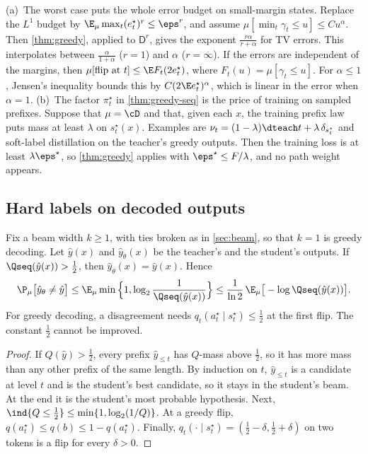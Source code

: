 \begin{remark}\label{rem:decoding-training}
(a)~The worst case puts the whole error budget on small-margin states. Replace the $L^1$ budget by
$\E_\mu\max_t(e^\star_t)^r\le\eps^r$, and assume $\mu[\min_t\gamma_t\le u]\le Cu^\alpha$. Then \cref{thm:greedy}, applied to
$\mathsf D^r$, gives the exponent $\frac{r\alpha}{r+\alpha}$ for TV errors. This interpolates between $\frac\alpha{1+\alpha}$ ($r=1$)
and $\alpha$ ($r=\infty$). If the errors are independent of the margins, then
$\mu[\text{flip at }t]\le\E F_t(2e^\star_t)$, where $F_t(u)=\mu[\gamma_t\le u]$. For $\alpha\le1$, Jensen's inequality bounds
this by $C(2\E e^\star_t)^\alpha$, which is linear in the error when $\alpha=1$.
(b)~The factor $\pi^\star_t$ in \cref{thm:greedy-seq} is the price of training on sampled prefixes. Suppose that
$\mu=\cD$ and that, given each $x$, the training prefix law puts mass at least $\lambda$ on $s^\star_t(x)$. Examples
are $\nu_t=(1-\lambda)\dteach t+\lambda\,\delta_{s^\star_t}$ and soft-label distillation on the teacher's greedy outputs.
Then the training loss is at least $\lambda\eps^\star$, so \cref{thm:greedy} applies with $\eps^\star\le F/\lambda$, and no
path weight appears.
\end{remark}

\subsection{Hard labels on decoded outputs}

\begin{proposition}\label{prop:hard}
\Pv\Ck Fix a beam width $k\ge1$, with ties broken as in \cref{sec:beam}, so that $k=1$ is greedy decoding. Let
$\hat y(x)$ and $\hat y_\theta(x)$ be the teacher's and the student's outputs. If $\Qseq(\hat y(x))>\frac12$, then $\hat y_\theta(x)=\hat y(x)$. Hence
\[
\P_\mu\big[\hat y_\theta\ne\hat y\big]\le\E_\mu\min\Big\{1,\log_2\frac1{\Qseq(\hat y(x))}\Big\}\le\frac1{\ln2}\,\E_\mu\big[-\log\Qseq(\hat y(x))\big].
\]
For greedy decoding, a disagreement needs $q_t(a^\star_t\mid s^\star_t)\le\frac12$ at the first flip. The constant $\frac12$
cannot be improved.
\end{proposition}
\begin{proof}
If $Q(\hat y)>\frac12$, every prefix $\hat y_{\le t}$ has $Q$-mass above $\frac12$, so it has more mass than any other
prefix of the same length. By induction on $t$, $\hat y_{\le t}$ is a candidate at level $t$ and is the
student's best candidate, so it stays in the student's beam. At the end it is the student's most
probable hypothesis. Next, $\ind\{Q\le\frac12\}\le\min\{1,\log_2(1/Q)\}$. At a greedy flip,
$q(a^\star_t)\le q(b)\le1-q(a^\star_t)$. Finally, $q_t(\cdot\mid s^\star_t)=(\frac12-\delta,\frac12+\delta)$ on two tokens is a flip
for every $\delta>0$.
\end{proof}

